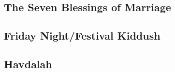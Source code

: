 ﻿\documentclass[a5paper, 12pt]{Birchon}
\begin{document}
\eject

\begin{english}
\subsection*{The Seven Blessings of Marriage}
\end{english}

\eject

\begin{english}
\section*{Friday Night/Festival Kiddush}
\end{english}

\eject

\begin{english}
\section*{Havdalah}
\end{english}

\eject
\end{document}
